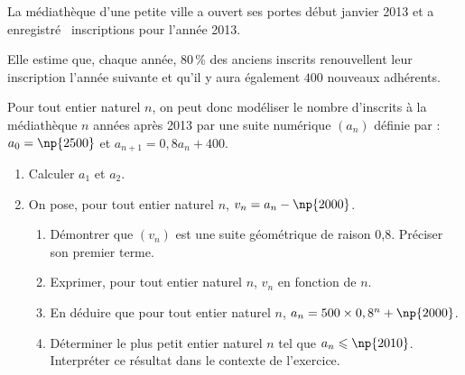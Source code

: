 \medskip

La médiathèque d'une petite ville a ouvert ses portes début janvier 2013 et a enregistré ~inscriptions pour l'année 2013.

Elle estime que, chaque année, 80\,\% des anciens inscrits renouvellent leur inscription l'année suivante et qu'il y aura également $400$ nouveaux adhérents.

Pour tout entier naturel $n$, on peut donc modéliser le nombre d'inscrits à la médiathèque $n$ années après 2013 par une suite numérique $(a_n)$ définie par :
$ a_0=\np{2500}$ et $a_{n+1}=0,8a_n + 400$.

\medskip

\begin{enumerate}
\item  Calculer $a_1$ et $a_2$.
\item On pose, pour tout entier naturel $n$, $v_n=a_n- \np{2000}$.
	\begin{enumerate}
		\item Démontrer que $\left(v_n\right)$ est une suite géométrique de raison 0,8. Préciser son premier terme.
		\item Exprimer, pour tout entier naturel $n$, $v_n$ en fonction de $n$.
		\item En déduire que pour tout entier naturel $n$, $a_n=500\times 0,8^n + \np{2000}$.
		\item Déterminer le plus petit entier naturel $n$ tel que $a_n\leqslant \np{2010}$. Interpréter ce résultat dans le contexte de l'exercice. 
	\end{enumerate}
\end{enumerate}
